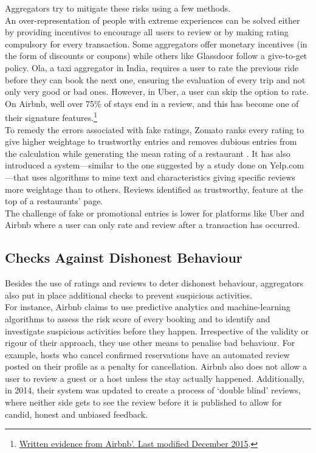 \documentclass[a4paper, 12pt, twoside]{article}
\begin{document}
Aggregators try to mitigate these risks using a few methods.\\

An over-representation of people with extreme experiences can be solved either by providing incentives to encourage all users to review or by making rating compulsory for every transaction. Some aggregators offer monetary incentives (in the form of discounts or coupons) while others like Glassdoor follow a give-to-get policy. Ola, a taxi aggregator in India, requires a user to rate the previous ride before they can book the next one, ensuring the evaluation of every trip and not only very good or bad ones. However, in Uber, a user can skip the option to rate. On Airbnb, well over 75\% of stays end in a review, and this has become one of their signature features.\footnote{\href{https://bit.ly/2MUOXEC}{Written evidence from Airbnb’. Last modified December 2015}.} \\

To remedy the errors associated with fake ratings, Zomato ranks every rating to give higher weightage to trustworthy entries and removes dubious entries from the calculation while generating the mean rating of a restaurant \parencite{GoyalD2012}. It has also introduced a system—similar to the one suggested by a study done on Yelp.com \parencite{luca2016reviews}—that uses algorithms to mine text and characteristics giving specific reviews more weightage than to others. Reviews identified as trustworthy, feature at the top of a restaurants’ page. \\

The challenge of fake or promotional entries is lower for platforms like Uber and Airbnb where a user can only rate and review after a transaction has occurred.

                                   
                    \subsection{Checks Against Dishonest Behaviour}
                    
                   Besides the use of ratings and reviews to deter dishonest behaviour, aggregators also put in place additional checks to prevent suspicious activities. \\

For instance, Airbnb claims to use predictive analytics and machine-learning algorithms to assess the risk score of every booking and to identify and investigate suspicious activities before they happen. Irrespective of the validity or rigour of their approach, they use other means to penalise bad behaviour. For example, hosts who cancel confirmed reservations have an automated review posted on their profile as a penalty for cancellation. Airbnb also does not allow a user to review a guest or a host unless the stay actually happened. Additionally, in 2014, their system was updated to create a process of ‘double blind’ reviews, where neither side gets to see the review before it is published to allow for candid, honest and unbiased feedback.  \\
                    
\end{document}
